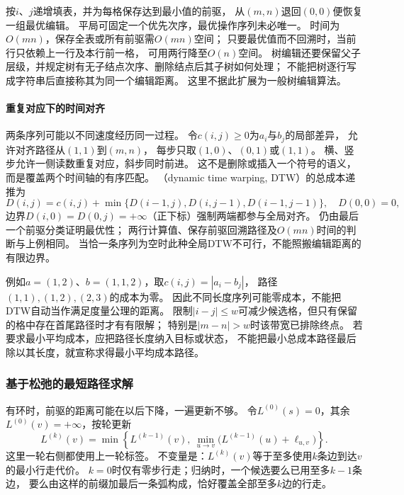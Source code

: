 按$i$、$j$递增填表，并为每格保存达到最小值的前驱，
从$(m,n)$退回$(0,0)$便恢复一组最优编辑。
平局可固定一个优先次序，最优操作序列未必唯一。
时间为$O(mn)$，保存全表或所有前驱需$O(mn)$空间；
只要最优值而不回溯时，当前行只依赖上一行及本行前一格，
可用两行降至$O(n)$空间。
树编辑还要保留父子层级，并规定树有无子结点次序、删除结点后其子树如何处理；
不能把树逐行写成字符串后直接称其为同一个编辑距离。
这里不据此扩展为一般树编辑算法。

\paragraph{重复对应下的时间对齐}
两条序列可能以不同速度经历同一过程。
令$c(i,j)\geq0$为$a_i$与$b_j$的局部差异，
允许对齐路径从$(1,1)$到$(m,n)$，
每步只取$(1,0)$、$(0,1)$或$(1,1)$。
横、竖步允许一侧读数重复对应，斜步同时前进。
这不是删除或插入一个符号的语义，而是覆盖两个时间轴的有序匹配。
（dynamic time warping, DTW）的总成本递推为
\begin{equation}
 D(i,j)=c(i,j)+\min\{D(i-1,j),D(i,j-1),D(i-1,j-1)\},
 \quad D(0,0)=0,
 \label{eq:graph-dtw-recursion}
\end{equation}
边界$D(i,0)=D(0,j)=+\infty$（正下标）强制两端都参与全局对齐。
仍由最后一个前驱分类证明最优性；
两行计算值、保存前驱回溯路径及$O(mn)$时间的判断与上例相同。
当恰一条序列为空时此种全局DTW不可行，不能照搬编辑距离的有限边界。

例如$a=(1,2)$、$b=(1,1,2)$，取$c(i,j)=|a_i-b_j|$，
路径$(1,1),(1,2),(2,3)$的成本为零。
因此不同长度序列可能零成本，不能把DTW自动当作满足度量公理的距离。
限制$|i-j|\leq w$可减少候选格，但只有保留的格中存在首尾路径时才有有限解；
特别是$|m-n|>w$时该带宽已排除终点。
若要求最小平均成本，应把路径长度纳入目标或状态，
不能把最小总成本路径最后除以其长度，就宣称求得最小平均成本路径。

\subsubsection{基于松弛的最短路径求解}

有环时，前驱的距离可能在以后下降，一遍更新不够。
令\(L^{(0)}(s)=0\)，其余\(L^{(0)}(v)=+\infty\)，按轮更新
\[
  L^{(k)}(v)=
  \min\left\{
    L^{(k-1)}(v),\
    \min_{u\to v}\bigl(L^{(k-1)}(u)+\ell_{u,v}\bigr)
  \right\}.
\]
这里一轮右侧都使用上一轮标签。
不变量是：\(L^{(k)}(v)\)等于至多使用\(k\)条边到达\(v\)的最小行走代价。
\(k=0\)时仅有零步行走；归纳时，一个候选要么已用至多\(k-1\)条边，
要么由这样的前缀加最后一条弧构成，恰好覆盖全部至多\(k\)边的行走。

